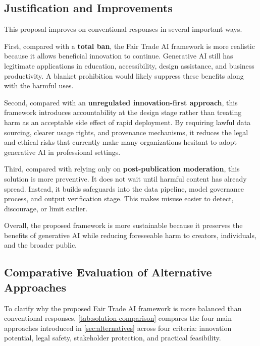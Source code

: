 \subsection{Justification and Improvements}\label{sec:justification}
This proposal improves on conventional responses in several important ways.

First, compared with a \textbf{total ban}, the Fair Trade AI framework is more realistic because it allows beneficial innovation to continue. Generative AI still has legitimate applications in education, accessibility, design assistance, and business productivity. A blanket prohibition would likely suppress these benefits along with the harmful uses.

Second, compared with an \textbf{unregulated innovation-first approach}, this framework introduces accountability at the design stage rather than treating harm as an acceptable side effect of rapid deployment. By requiring lawful data sourcing, clearer usage rights, and provenance mechanisms, it reduces the legal and ethical risks that currently make many organizations hesitant to adopt generative AI in professional settings.

Third, compared with relying only on \textbf{post-publication moderation}, this solution is more preventive. It does not wait until harmful content has already spread. Instead, it builds safeguards into the data pipeline, model governance process, and output verification stage. This makes misuse easier to detect, discourage, or limit earlier.

Overall, the proposed framework is more sustainable because it preserves the benefits of generative AI while reducing foreseeable harm to creators, individuals, and the broader public.

\subsection{Comparative Evaluation of Alternative Approaches}\label{sec:comparison}
To clarify why the proposed Fair Trade AI framework is more balanced than conventional responses, \cref{tab:solution-comparison} compares the four main approaches introduced in \cref{sec:alternatives} across four criteria: innovation potential, legal safety, stakeholder protection, and practical feasibility.

